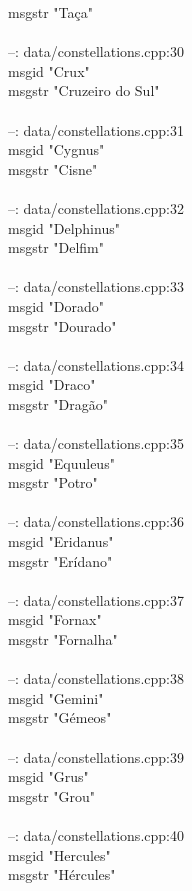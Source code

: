 \documentclass[10pt]{article}
\begin{document}
msgstr "Taça"\\
\\
--: data/constellations.cpp:30\\
msgid "Crux"\\
msgstr "Cruzeiro do Sul"\\
\\
--: data/constellations.cpp:31\\
msgid "Cygnus"\\
msgstr "Cisne"\\
\\
--: data/constellations.cpp:32\\
msgid "Delphinus"\\
msgstr "Delfim"\\
\\
--: data/constellations.cpp:33\\
msgid "Dorado"\\
msgstr "Dourado"\\
\\
--: data/constellations.cpp:34\\
msgid "Draco"\\
msgstr "Dragão"\\
\\
--: data/constellations.cpp:35\\
msgid "Equuleus"\\
msgstr "Potro"\\
\\
--: data/constellations.cpp:36\\
msgid "Eridanus"\\
msgstr "Erídano"\\
\\
--: data/constellations.cpp:37\\
msgid "Fornax"\\
msgstr "Fornalha"\\
\\
--: data/constellations.cpp:38\\
msgid "Gemini"\\
msgstr "Gémeos"\\
\\
--: data/constellations.cpp:39\\
msgid "Grus"\\
msgstr "Grou"\\
\\
--: data/constellations.cpp:40\\
msgid "Hercules"\\
msgstr "Hércules"\\
\end{document}
